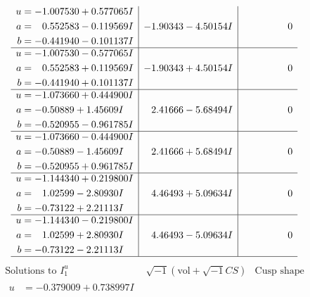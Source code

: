 \documentclass[1p]{elsarticle_modified}
\theoremstyle{definition}
\newcommand{\I}{\sqrt{-1}}
\begin{document}
$$\begin{array}{c|c|c}
\begin{aligned}
u &= -1.007530 + 0.577065 I \\
a &= \phantom{-}0.552583 - 0.119569 I \\
b &= -0.441940 - 0.101137 I\end{aligned}
 & -1.90343 - 4.50154 I & \phantom{-0.000000 } 0 \\ \hline\begin{aligned}
u &= -1.007530 - 0.577065 I \\
a &= \phantom{-}0.552583 + 0.119569 I \\
b &= -0.441940 + 0.101137 I\end{aligned}
 & -1.90343 + 4.50154 I & \phantom{-0.000000 } 0 \\ \hline\begin{aligned}
u &= -1.073660 + 0.444900 I \\
a &= -0.50889 + 1.45609 I \\
b &= -0.520955 - 0.961785 I\end{aligned}
 & \phantom{-}2.41666 - 5.68494 I & \phantom{-0.000000 } 0 \\ \hline\begin{aligned}
u &= -1.073660 - 0.444900 I \\
a &= -0.50889 - 1.45609 I \\
b &= -0.520955 + 0.961785 I\end{aligned}
 & \phantom{-}2.41666 + 5.68494 I & \phantom{-0.000000 } 0 \\ \hline\begin{aligned}
u &= -1.144340 + 0.219800 I \\
a &= \phantom{-}1.02599 - 2.80930 I \\
b &= -0.73122 + 2.21113 I\end{aligned}
 & \phantom{-}4.46493 + 5.09634 I & \phantom{-0.000000 } 0 \\ \hline\begin{aligned}
u &= -1.144340 - 0.219800 I \\
a &= \phantom{-}1.02599 + 2.80930 I \\
b &= -0.73122 - 2.21113 I\end{aligned}
 & \phantom{-}4.46493 - 5.09634 I & \phantom{-0.000000 } 0\\
 \hline 
 \end{array}$$\newpage$$\begin{array}{c|c|c}  
\text{Solutions to }I^u_{1}& \I (\text{vol} + \sqrt{-1}CS) & \text{Cusp shape}\\
 \hline 
\begin{aligned}
u &= -0.379009 + 0.738997 I \\

\end{aligned}
\end{array}$$
\end{document}
